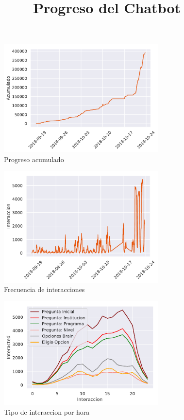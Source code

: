\documentclass[12pt]{article}
\title{Progreso del Chatbot}
\date{}
\begin{document}
\maketitle

\begin{figure}[h]
\caption{Progreso acumulado}
\centering
\includegraphics[width=0.75\textwidth]{Cummulative_progress.pdf}
\end{figure}

\begin{figure}[h]
\caption{Frecuencia de interacciones}
\centering
\includegraphics[width=0.75\textwidth]{Frequency_interactions.pdf}
\end{figure}


\begin{figure}[h]
\caption{Tipo de interaccion por hora}
\centering
\includegraphics[width=0.75\textwidth]{Interaction_type.pdf}
\end{figure}
\end{document}
